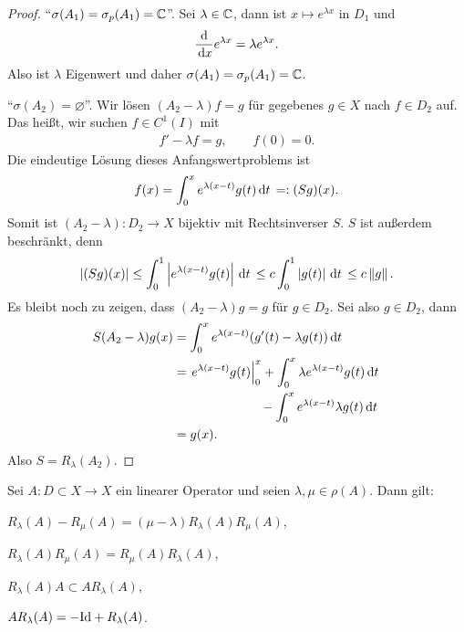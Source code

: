 \begin{bsp*}
\begin{bspenum}
\begin{proof}
``\textit{$\sigma(A_1) = \sigma_p(A_1) = \mathbb{C}$}''.
Sei $\lambda \in \mathbb{C}$, dann ist $x \mapsto e^{\lambda x}$ in $D_1$ und
\begin{align*}
\frac{\mathrm{d}}{\,\mathrm{d} x}e^{\lambda x} = \lambda e^{\lambda x}.
\end{align*}
Also ist $\lambda$ Eigenwert und daher
 $\sigma(A_1) = \sigma_p(A_1) = \mathbb{C}$.

``\textit{$\sigma(A_2)=\varnothing$}''.
Wir lösen $(A_2-\lambda) f = g$
für gegebenes $g \in X$ nach $f \in D_2$ auf. Das heißt, wir suchen
$f \in C^1(I)$ mit 
\begin{align*}
f'-\lambda f = g, \qquad f(0) = 0.
\end{align*}
Die eindeutige Lösung dieses Anfangswertproblems ist
\begin{align*}
f(x) = \int_{0}^{x} e^{\lambda(x-t)}g(t)\,\mathrm{d} t\, =: (Sg)(x).
\end{align*}
Somit ist $(A_2-\lambda):D_2\to X$ bijektiv mit Rechtsinverser $S$.
$S$ ist außerdem beschränkt, denn
\begin{align*}
\left|(Sg)(x)\right| \le \int_0^1 \left|e^{\lambda(x-t)}g(t)\right|\,\mathrm{d} t\,
\le c\int_0^1 \left|g(t)\right|\,\mathrm{d} t\, \le c\left\|g\right\|.
\end{align*}
Es bleibt noch zu zeigen, dass $(A_2-\lambda)g = g$ für $g \in D_2$. Sei
also $g \in D_2$, dann
\begin{align*}
S(A_2-\lambda)g(x) 
& = \int_{0}^{x} e^{\lambda(x-t)}(g'(t)-\lambda g(t))\dt \\
& = \left. e^{\lambda(x-t)} g(t) \right|_{0}^{x} 
+ \int_{0}^{x} \lambda e^{\lambda(x-t)}g(t)\dt\\ 
& \phantom{ = \left. e^{\lambda(x-t)} g(t) \right|_{0}^{x}\,}
- \int_{0}^{x} e^{\lambda(x-t)} \lambda g(t)\dt\\
& = g(x).
\end{align*}
Also $S = R_{\lambda}(A_2)$.\bsphere
\end{proof}
\end{bspenum}
\end{bsp*}


\begin{prop}
\label{prop:3.1}
Sei $A: D \subset X \to X$ ein linearer Operator und
seien $\lambda,\mu \in \rho(A)$. Dann gilt:
\begin{propenum}
\item\label{prop:3.1:1} $R_{\lambda}(A)-R_{\mu}(A) = (\mu-\lambda)
R_{\lambda}(A)R_{\mu}(A)$,
\item\label{prop:3.1:2} $R_{\lambda}(A) R_{\mu}(A) = R_{\mu}(A) R_{\lambda}(A)$,
\item\label{prop:3.1:3} $R_{\lambda}(A) A \subset A R_{\lambda}(A)$,
\item\label{prop:3.1:4} $A R_{\lambda}(A) = -\mathrm{Id} + R_{\lambda}(A)$.\fishhere
\end{propenum}
\end{prop}

